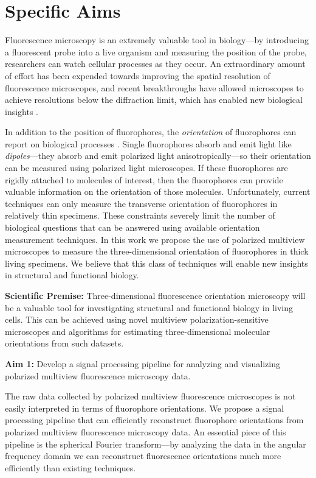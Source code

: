 \documentclass[11pt]{article}
\begin{document}
\section*{Specific Aims}
Fluorescence microscopy is an extremely valuable tool in biology---by
introducing a fluorescent probe into a live organism and measuring the position
of the probe, researchers can watch cellular processes as they occur. An
extraordinary amount of effort has been expended towards improving the spatial
resolution of fluorescence microscopes, and recent breakthroughs have allowed
microscopes to achieve resolutions below the diffraction limit, which has
enabled new biological insights \cite{nobel}.

In addition to the position of fluorophores, the \textit{orientation} of
fluorophores can report on biological processes \cite{weiss1999}. Single
fluorophores absorb and emit light like \textit{dipoles}---they absorb and emit
polarized light anisotropically---so their orientation can be measured using
polarized light microscopes. If these fluorophores are rigidly attached to
molecules of interest, then the fluorophores can provide valuable information on
the orientation of those molecules. Unfortunately, current techniques can only
measure the transverse orientation of fluorophores in relatively thin
specimens. These constraints severely limit the number of biological questions
that can be answered using available orientation measurement techniques. In this
work we propose the use of polarized multiview microscopes to measure the
three-dimensional orientation of fluorophores in thick living specimens. We
believe that this class of techniques will enable new insights in structural and
functional biology.

\noindent\textbf{Scientific Premise:} Three-dimensional fluorescence orientation
microscopy will be a valuable tool for investigating structural and functional
biology in living cells. This can be achieved using novel multiview
polarization-sensitive microscopes and algorithms for estimating
three-dimensional molecular orientations from such datasets.

\noindent\textbf{Aim 1:} Develop a signal processing pipeline for analyzing and visualizing polarized multiview fluorescence microscopy data.

The raw data collected by polarized multiview fluorescence microscopes is not
easily interpreted in terms of fluorophore orientations. We propose a signal
processing pipeline that can efficiently reconstruct fluorophore orientations
from polarized multiview fluorescence microscopy data. An essential piece of
this pipeline is the spherical Fourier transform---by analyzing the data in the
angular frequency domain we can reconstruct fluorescence orientations much more
efficiently than existing techniques.
\end{document}
